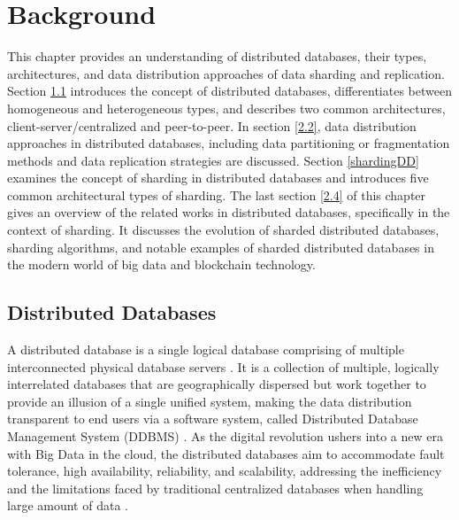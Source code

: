
\chapter{Background}\label{ch:relatedwork}
This chapter provides an understanding of distributed databases, their types, architectures, and data distribution approaches of data sharding and replication. Section \ref{2.1} introduces the concept of distributed databases, differentiates between homogeneous and heterogeneous types, and describes two common architectures, client-server/centralized and peer-to-peer. In section \ref{2.2}, data distribution approaches in distributed databases, including data partitioning or fragmentation methods and data replication strategies are discussed. Section \ref{shardingDD} examines the concept of sharding in distributed databases and introduces five common architectural types of sharding. The last section \ref{2.4} of this chapter gives an overview of the related works in distributed databases, specifically in the context of sharding. It discusses the evolution of sharded distributed databases, sharding algorithms, and notable examples of sharded distributed databases in the modern world of big data and blockchain technology.

\section{Distributed Databases}
\label{2.1}
A distributed database is a single logical database comprising of multiple interconnected physical database servers \cite{ramakrishnan2003database, rahimi2010distributed}. It is a collection of multiple, logically interrelated databases that are geographically dispersed but work together to provide an illusion of a single unified system, making the data distribution transparent to end users via a software system, called Distributed Database Management System (DDBMS) \cite{ozsu1999principles}. As the digital revolution ushers into a new era with Big Data in the cloud, the distributed databases aim to accommodate fault tolerance, high availability, reliability, and scalability, addressing the inefficiency and the limitations faced by traditional centralized databases when handling large amount of data \cite{bagui2015database}. \\

